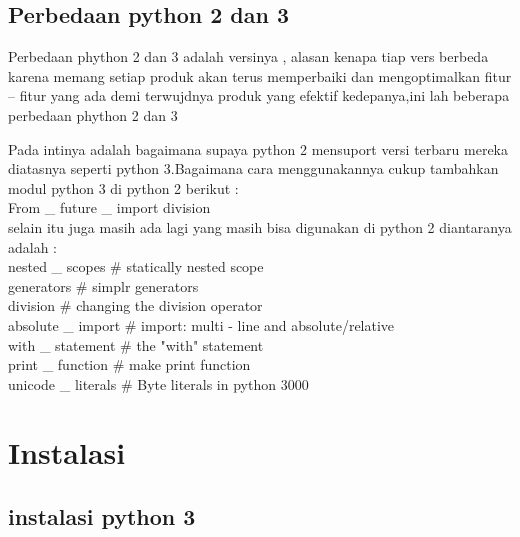 \subsection{Perbedaan python 2 dan 3}
\par Perbedaan phython 2 dan 3 adalah versinya , alasan kenapa tiap vers berbeda karena memang setiap produk akan terus memperbaiki dan mengoptimalkan fitur – fitur yang ada demi terwujdnya produk yang efektif kedepanya,ini lah beberapa perbedaan phython 2 dan 3
\par Pada intinya adalah bagaimana supaya python 2 mensuport versi terbaru mereka diatasnya seperti python 3.Bagaimana cara menggunakannya cukup tambahkan modul python 3 di python 2 berikut : \\
From _ future _ import division\\
selain itu juga masih ada lagi yang masih bisa digunakan di python 2 diantaranya adalah : \\
nested _ scopes # statically nested scope \\
generators # simplr generators\\
division # changing the division operator\\
absolute _ import # import: multi - line and absolute/relative \\
with _ statement # the "with" statement\\
print _ function # make print function\\
unicode _ literals # Byte literals in python 3000

\section{Instalasi}
\subsection{instalasi python 3}

